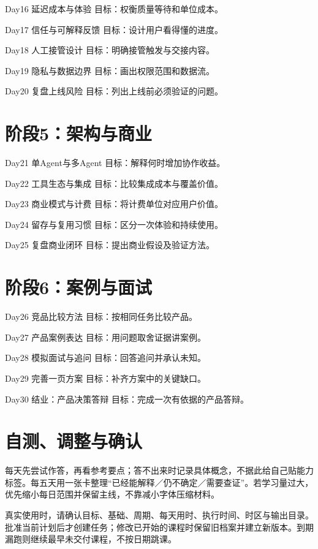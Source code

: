 \documentclass[11pt]{article}
\newcommand{\Needspace}[1]{\par\ifdim\dimexpr\pagegoal-\pagetotal\relax<#1\relax\newpage\fi}
\begin{document}
Day16  延迟成本与体验
目标：权衡质量等待和单位成本。

Day17  信任与可解释反馈
目标：设计用户看得懂的进度。

Day18  人工接管设计
目标：明确接管触发与交接内容。

Day19  隐私与数据边界
目标：画出权限范围和数据流。

Day20  复盘上线风险
目标：列出上线前必须验证的问题。

\Needspace{5\baselineskip}\section*{阶段5：架构与商业}

Day21  单Agent与多Agent
目标：解释何时增加协作收益。

Day22  工具生态与集成
目标：比较集成成本与覆盖价值。

Day23  商业模式与计费
目标：将计费单位对应用户价值。

Day24  留存与复用习惯
目标：区分一次体验和持续使用。

Day25  复盘商业闭环
目标：提出商业假设及验证方法。

\Needspace{5\baselineskip}\section*{阶段6：案例与面试}

Day26  竞品比较方法
目标：按相同任务比较产品。

Day27  产品案例表达
目标：用问题取舍证据讲案例。

Day28  模拟面试与追问
目标：回答追问并承认未知。

Day29  完善一页方案
目标：补齐方案中的关键缺口。

Day30  结业：产品决策答辩
目标：完成一次有依据的产品答辩。

\Needspace{5\baselineskip}\section*{自测、调整与确认}

每天先尝试作答，再看参考要点；答不出来时记录具体概念，不据此给自己贴能力标签。每五天用一张卡整理“已经能解释／仍不确定／需要查证”。若学习量过大，优先缩小每日范围并保留主线，不靠减小字体压缩材料。

真实使用时，请确认目标、基础、周期、每天用时、执行时间、时区与输出目录。批准当前计划后才创建任务；修改已开始的课程时保留旧档案并建立新版本。到期漏跑则继续最早未交付课程，不按日期跳课。
\end{document}
